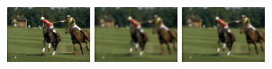 \documentclass[runningheads]{llncs}
\begin{document}
\begin{figure}[t]
   \centering
  \includegraphics[width=0.22\textwidth]{bsd070_orig.png}
  \includegraphics[width=0.22\textwidth]{bsd070_bicubic.png}
  \includegraphics[width=0.22\textwidth]{bsd070_pix.png}

\end{figure}
\end{document}
